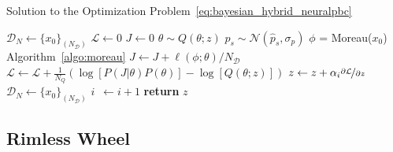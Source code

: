 \begin{algorithm}
    \caption{Solution to the Optimization Problem~\eqref{eq:bayesian_hybrid_neuralpbc}}
    \label{algo:bayes_neuralpbc}
    \small
    \begin{algorithmic}[1]
        \algrenewcommand\algorithmicindent{0em} %
        \State $\mathcal{D}_N \gets \{x_0\}_{(N_{\mathcal{D}})}$   
        \algrenewcommand\algorithmicindent{1.1em} %
        \State $\mathcal{L} \gets 0$ 
         
        \State $J \gets 0$ 
        \State $\theta \sim Q(\theta; z)$ 
            \State $p_s \sim \mathcal{N}(\hat{p}_s, \sigma_p)$
            \State $\phi$ = Moreau($x_0$) \Comment Algorithm~\eqref{algo:moreau}
            \State $J \gets J + \ell(\phi; \theta)/N_{\mathcal{D}}$ 
            \EndFor
        \State $\mathcal{L} \gets \mathcal{L} + \frac{1}{N_Q} \left(\log[P(J | \theta) P(\theta)] - \log[Q(\theta;z)]\right)$
        \EndFor
        \State $z \gets z + \alpha_i \nicefrac{\partial \mathcal{L}}{\partial z}$
        \State $\mathcal{D}_N \gets \{x_0\}_{(N_{\mathcal{D}})}$
        \State $i \;\:\gets i + 1$
        \EndWhile
        \State \textbf{return} $z$
    \end{algorithmic}
\end{algorithm}

\subsection{Rimless Wheel}
\label{sssec:rimless_wheel_model}

